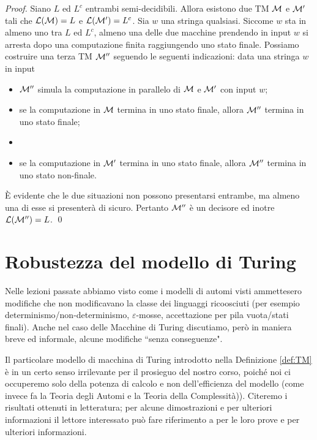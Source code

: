 \documentclass[runningheads,a4paper]{llncs}
\begin{document}
\begin{proof}
Siano $L$ ed $L^c$ entrambi semi-decidibili. Allora esistono due TM $\mathcal{M}$ e $\mathcal{M}'$ tali che $\mathcal{L}(\mathcal{M}) = L$ e $\mathcal{L}(\mathcal{M}') = L^c$. Sia $w$ una stringa qualsiasi. Siccome $w$ sta in almeno uno tra $L$ ed $L^c$, almeno una delle due macchine prendendo in input $w$ si arresta dopo una computazione finita raggiungendo uno stato finale. Possiamo costruire una terza TM $\mathcal{M}''$ seguendo le seguenti indicazioni: data una stringa $w$ in input
\begin{itemize}
\item $\mathcal{M}''$ simula la computazione in parallelo di $\mathcal{M}$ e $\mathcal{M}'$ con input $w$;
\item se la computazione in $\mathcal{M}$ termina in uno stato finale, allora $\mathcal{M}''$ termina in uno stato finale;
\item \item se la computazione in $\mathcal{M}'$ termina in uno stato finale, allora $\mathcal{M}''$ termina in uno stato non-finale.
\end{itemize}
\`{E} evidente che le due situazioni non possono presentarsi entrambe, ma almeno una di esse si presenter\`{a} di sicuro. Pertanto $\mathcal{M}''$ \`{e} un decisore ed inotre $\mathcal{L}(\mathcal{M}'') = L$.
\qed\end{proof}

\section{Robustezza del modello di Turing}

Nelle lezioni passate abbiamo visto come i modelli di automi visti ammettesero modifiche che non modificavano la classe dei linguaggi ricoosciuti (per esempio determinismo/non-determinismo, $\varepsilon$-mosse, accettazione per pila vuota/stati finali). Anche nel caso delle Macchine di Turing discutiamo, per\`{o} in maniera breve ed informale, alcune modifiche ``senza conseguenze".

Il particolare modello di macchina di Turing introdotto nella Definizione \ref{def:TM} \`{e} in un certo senso irrilevante per il prosieguo del nostro corso, poich\'{e} noi ci occuperemo solo della potenza di calcolo e non dell'efficienza del modello (come invece fa la Teoria degli Automi e la Teoria della Complessit\`{a})). Citeremo i risultati ottenuti in letteratura; per alcune dimostrazioni e per ulteriori informazioni il lettore interessato pu\`{o} fare riferimento a \cite{HMU,Minsky67,Arbib69} per le loro prove e per ulteriori informazioni.
\end{document}
